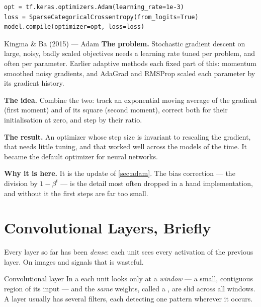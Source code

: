 \begin{lstlisting}[style=tfkeras, caption={Adam in Keras.}, label={lst:adam}]
opt = tf.keras.optimizers.Adam(learning_rate=1e-3)
loss = SparseCategoricalCrossentropy(from_logits=True)
model.compile(optimizer=opt, loss=loss)
\end{lstlisting}

\begin{researchspotlight}{Kingma \& Ba (2015) --- Adam}
\textbf{The problem.} Stochastic gradient descent on large, noisy, badly scaled
objectives needs a learning rate tuned per problem, and often per parameter.
Earlier adaptive methods each fixed part of this: momentum smoothed noisy
gradients, and AdaGrad and RMSProp scaled each parameter by its gradient
history.

\textbf{The idea.} Combine the two: track an exponential moving average of the
gradient (first moment) and of its square (second moment), correct both for
their initialisation at zero, and step by their ratio.

\textbf{The result.} An optimizer whose step size is invariant to rescaling the
gradient, that needs little tuning, and that worked well across the models of
the time. It became the default optimizer for neural networks.

\textbf{Why it is here.} It is the update of \cref{sec:adam}. The bias
correction --- the division by $1 - \beta^t$ --- is the detail most often
dropped in a hand implementation, and without it the first steps are far too
small.
\parencite{kingma2015}
\end{researchspotlight}

\section{Convolutional Layers, Briefly}
\label{sec:conv}

Every layer so far has been \emph{dense}: each unit sees every activation of the
previous layer. On images and signals that is wasteful.

\begin{defbox}{Convolutional layer}
In a  each unit looks only at a \emph{window} --- a
small, contiguous region of its input --- and the \emph{same} weights, called a
, are slid across all windows. A layer usually has several
filters, each detecting one pattern wherever it occurs.
\end{defbox}

